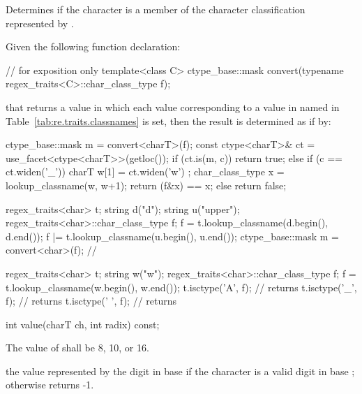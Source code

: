 \begin{itemdescr}
\pnum
\effects  Determines if the character  is a member of the character
classification represented by .

\pnum
\returns Given the following function declaration:
\begin{codeblock}
// for exposition only
template<class C>
  ctype_base::mask convert(typename regex_traits<C>::char_class_type f);
\end{codeblock}
that returns a value in which each  value corresponding to
a value in  named in Table~\ref{tab:re.traits.classnames} is set, then the
result is determined as if by:
\begin{codeblock}
ctype_base::mask m = convert<charT>(f);
const ctype<charT>& ct = use_facet<ctype<charT>>(getloc());
if (ct.is(m, c)) {
  return true;
} else if (c == ct.widen('_')) {
  charT w[1] = { ct.widen('w') };
  char_class_type x = lookup_classname(w, w+1);
  return (f&x) == x;
} else {
  return false;
}
\end{codeblock}
\begin{example}
\begin{codeblock}
regex_traits<char> t;
string d("d");
string u("upper");
regex_traits<char>::char_class_type f;
f = t.lookup_classname(d.begin(), d.end());
f |= t.lookup_classname(u.begin(), u.end());
ctype_base::mask m = convert<char>(f); // 
\end{codeblock}
\end{example}
\begin{example}
\begin{codeblock}
regex_traits<char> t;
string w("w");
regex_traits<char>::char_class_type f;
f = t.lookup_classname(w.begin(), w.end());
t.isctype('A', f); // returns 
t.isctype('_', f); // returns 
t.isctype(' ', f); // returns 
\end{codeblock}
\end{example}

\end{itemdescr}

%
\begin{itemdecl}
int value(charT ch, int radix) const;
\end{itemdecl}

\begin{itemdescr}
\pnum
\requires  The value of  shall be 8, 10, or 16.

\pnum
\returns the value represented by the digit  in base
 if the character  is a valid digit in base
; otherwise returns -1.
\end{itemdescr}


